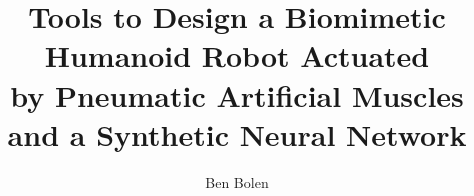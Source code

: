\documentclass[double,12pt]{psutex}
\title{Tools to Design a Biomimetic Humanoid Robot Actuated\\ by Pneumatic Artificial Muscles and a Synthetic Neural Network} %
\author{Ben Bolen}
\begin{document}
\maketitle









% 

\tableofcontents
\listoftables
\listoffigures

\mainmatter











\appendix
\renewcommand{\theequation}{\thechapter\arabic{equation}}
\renewcommand{\thetable}{\thechapter\arabic{table}}
\renewcommand{\thefigure}{\thechapter\arabic{figure}}





\end{document}
